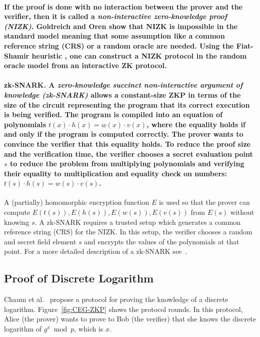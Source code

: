 \documentclass[11pt]{article}
\theoremstyle{plain}
\begin{document}
\paragraph{\textmd{If the proof is done with no interaction between the prover
		and the verifier, then it is called a }\textmd{\emph{non-interactive
			zero-knowledge proof (NIZK)}}\textmd{. Goldreich and Oren \cite{Goldreich1994}
		show that NIZK is impossible in the standard model meaning that some
		assumption like a common reference string (CRS) or a random oracle
		are needed. Using the Fiat-Shamir heuristic \cite{Fiat1987}, one
		can construct a NIZK protocol in the random oracle model from an interactive
		ZK protocol. }}

\paragraph{zk-SNARK.\textmd{ A }\textmd{\emph{zero-knowledge succinct non-interactive
			argument of knowledge (zk-SNARK)}}\textmd{ allows a constant-size
		ZKP in terms of the size of the circuit representing the program that
		its correct execution is being verified. The program is compiled into
		an equation of polynomials $t(x)\cdot h(x)=w(x)\cdot v(x)$, where
		the equality holds if and only if the program is computed correctly.
		The prover wants to convince the verifier that this equality holds.
		To reduce the proof size and the verification time, the verifier chooses
		a secret evaluation point $s$ to reduce the problem from multiplying
		polynomials and verifying their equality to multiplication and equality
		check on numbers: $t(s)\cdot h(s)=w(s)\cdot v(s)$.}}

A (partially) homomorphic encryption function $E$ is used so that
the prover can compute $E(t(s)),E(h(s)),E(w(s)),E(v(s))$ from $E(s)$
without knowing $s$. A zk-SNARK requires a trusted setup which generates
a common reference string (CRS) for the NIZK. In this setup, the verifier
chooses a random and secret field element $s$ and encrypts the values
of the polynomials at that point. For a more detailed description
of a zk-SNARK see~\cite{zk-snarks:nutshell}.

\subsection{Proof of Discrete Logarithm}

Chaum et al.\ \cite{Chaum:87:ZKP} propose a protocol for proving
the knowledge of a discrete logarithm. Figure~\ref{fig:CEG-ZKP}
shows the protocol rounds. In this protocol, Alice (the prover) wants
to prove to Bob (the verifier) that she knows the discrete logarithm
of $g^{x}\bmod p$, which is $x$.
\end{document}
